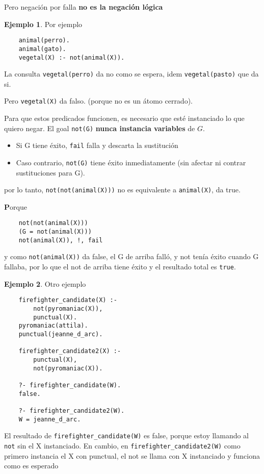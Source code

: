 \documentclass{report}
\theoremstyle{definition} %
\newtheorem*{example*}{Ejemplo}
\newenvironment{nota}[1]
    {\begin{leftbar}\textbf{#1}}
    {\end{leftbar}}
\begin{document}
Pero negación por falla \textbf{no es la negación lógica}

\begin{example*} Por ejemplo
    \begin{verbatim}
    animal(perro).
    animal(gato).
    vegetal(X) :- not(animal(X)).
    \end{verbatim}

    La consulta \texttt{vegetal(perro)} da no como se espera, idem
    \texttt{vegetal(pasto)} que da si.
    
    Pero \texttt{vegetal(X)} da falso. (porque no es un átomo cerrado).
\end{example*}

Para que estos predicados funcionen, es necesario que esté instanciado lo que
quiero negar. El goal \texttt{not(G)} \textbf{nunca instancia variables} de $G$.

\begin{itemize}
    \item Si G tiene éxito, \texttt{fail} falla y descarta la sustitución
    \item Caso contrario, \texttt{not(G)} tiene éxito inmediatamente (sin
    afectar ni contrar sustituciones para G).
\end{itemize}

por lo tanto, \texttt{not(not(animal(X)))} no es equivalente a
\texttt{animal(X)}, da true.

\begin{nota}
    Porque
    \begin{verbatim}
    not(not(animal(X)))
    (G = not(animal(X)))
    not(animal(X)), !, fail
    \end{verbatim}
    y como \texttt{not(animal(X))} da false, el G de arriba falló, y not tenía
    éxito cuando G fallaba, por lo que el not de arriba tiene éxito y el
    resultado total es \texttt{true}.
\end{nota}

\begin{example*} Otro ejemplo
    \begin{verbatim}
    firefighter_candidate(X) :-
        not(pyromaniac(X)),
        punctual(X).
    pyromaniac(attila).
    punctual(jeanne_d_arc).

    firefighter_candidate2(X) :-
        punctual(X),
        not(pyromaniac(X)).
    
    ?- firefighter_candidate(W).
    false.
    
    ?- firefighter_candidate2(W).
    W = jeanne_d_arc.
    \end{verbatim}

    El resultado de \texttt{firefighter\_candidate(W)} es false, porque estoy
    llamando al \texttt{not} sin el X instanciado. En cambio, en
    \texttt{firefighter\_candidate2(W)} como primero instancia el X con punctual,
    el not se llama con X instanciado y funciona como es esperado
\end{example*}
\end{document}
